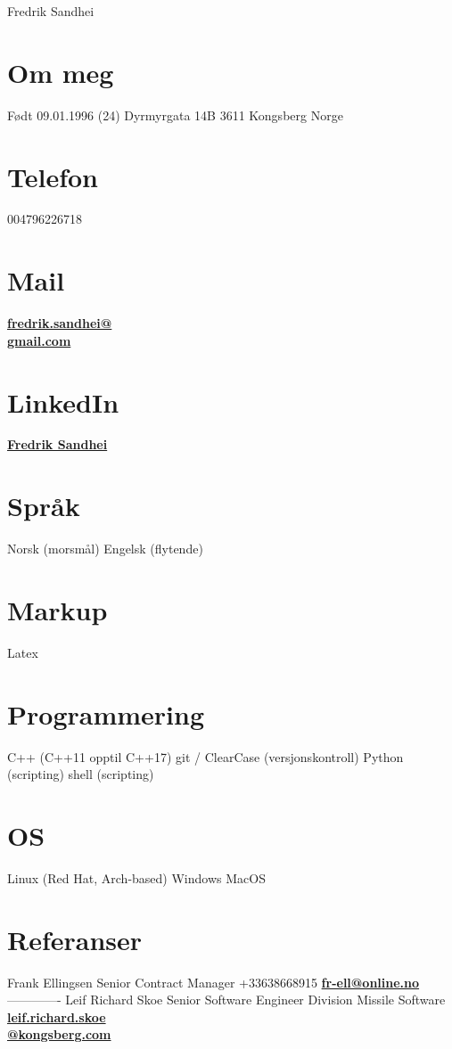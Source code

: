 \documentclass[]{friggeri-cv}
\begin{document}
       {Fredrik Sandhei}

\begin{aside}
  \section{Om meg}
    Født 09.01.1996 (24)
    Dyrmyrgata 14B 
    3611 Kongsberg
    Norge
  \section{Telefon}
    004796226718
  \section{Mail}
    \href{mailto:fredrik.sandhei@gmail.com}{\textbf{fredrik.sandhei@\\gmail.com}}   
  \section{LinkedIn}
  	\href{https://www.linkedin.com/in/fredrik-sandhei-7738b617a/}{\textbf{Fredrik Sandhei}}
  \section{Språk}
    Norsk (morsmål)
    Engelsk (flytende)
  \section{Markup}
  	Latex
  \section{Programmering}
    C++ (C++11 opptil C++17)
    git / ClearCase (versjonskontroll)
    Python (scripting)
    shell (scripting)
  \section{OS}
  	Linux (Red Hat, Arch-based)
  	Windows
  	MacOS
  \section{Referanser}
    Frank Ellingsen
    Senior Contract Manager
    +33\hspace{0.1cm}638668915
    \href{mailto:fr-ell@online.no}{\textbf{fr-ell@online.no}}
    -------------
    Leif Richard Skoe
    Senior Software Engineer
	Division Missile Software
	    \href{mailto:leif.richard.skoe@kongsberg.com}{\textbf{leif.richard.skoe\\@kongsberg.com}}	
\end{aside}
\end{document}
